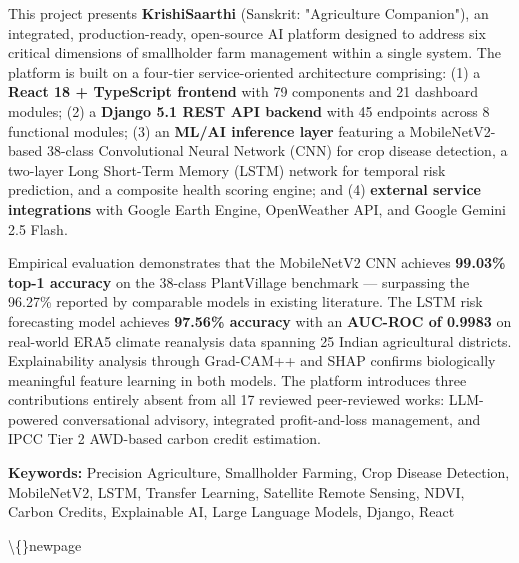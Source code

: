 \documentclass[12pt, a4paper]{report}
\begin{document}
This project presents \textbf{KrishiSaarthi} (Sanskrit: "Agriculture Companion"), an integrated, production-ready, open-source AI platform designed to address six critical dimensions of smallholder farm management within a single system. The platform is built on a four-tier service-oriented architecture comprising: (1) a \textbf{React 18 + TypeScript frontend} with 79 components and 21 dashboard modules; (2) a \textbf{Django 5.1 REST API backend} with 45 endpoints across 8 functional modules; (3) an \textbf{ML/AI inference layer} featuring a MobileNetV2-based 38-class Convolutional Neural Network (CNN) for crop disease detection, a two-layer Long Short-Term Memory (LSTM) network for temporal risk prediction, and a composite health scoring engine; and (4) \textbf{external service integrations} with Google Earth Engine, OpenWeather API, and Google Gemini 2.5 Flash.

Empirical evaluation demonstrates that the MobileNetV2 CNN achieves \textbf{99.03\% top-1 accuracy} on the 38-class PlantVillage benchmark --- surpassing the 96.27\% reported by comparable models in existing literature. The LSTM risk forecasting model achieves \textbf{97.56\% accuracy} with an \textbf{AUC-ROC of 0.9983} on real-world ERA5 climate reanalysis data spanning 25 Indian agricultural districts. Explainability analysis through Grad-CAM++ and SHAP confirms biologically meaningful feature learning in both models. The platform introduces three contributions entirely absent from all 17 reviewed peer-reviewed works: LLM-powered conversational advisory, integrated profit-and-loss management, and IPCC Tier 2 AWD-based carbon credit estimation.

\textbf{Keywords:} Precision Agriculture, Smallholder Farming, Crop Disease Detection, MobileNetV2, LSTM, Transfer Learning, Satellite Remote Sensing, NDVI, Carbon Credits, Explainable AI, Large Language Models, Django, React

\textbackslash\{\}newpage
\end{document}
